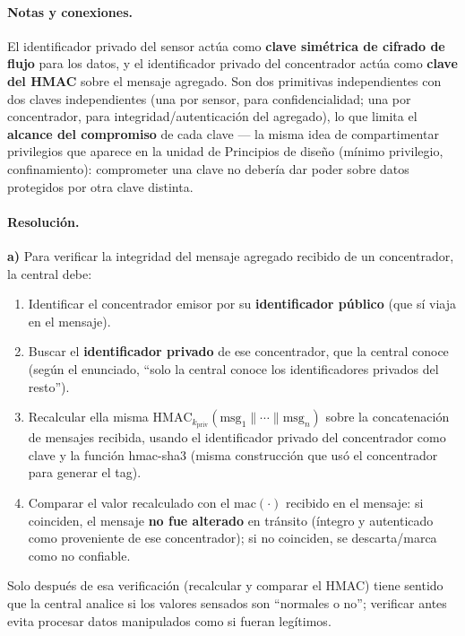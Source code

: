 \paragraph{Notas y conexiones.}
El identificador privado del sensor actúa como \textbf{clave simétrica de cifrado de
flujo} para los datos, y el identificador privado del concentrador actúa como
\textbf{clave del HMAC} sobre el mensaje agregado. Son dos primitivas independientes
con dos claves independientes (una por sensor, para confidencialidad; una por
concentrador, para integridad/autenticación del agregado), lo que limita el
\textbf{alcance del compromiso} de cada clave --- la misma idea de compartimentar
privilegios que aparece en la unidad de Principios de diseño (mínimo privilegio,
confinamiento): comprometer una clave no debería dar poder sobre datos protegidos por
otra clave distinta.

\paragraph{Resolución.}

\textbf{a)} Para verificar la integridad del mensaje agregado recibido de un
concentrador, la central debe:
\begin{enumerate}
  \item Identificar el concentrador emisor por su \textbf{identificador público}
  (que sí viaja en el mensaje).
  \item Buscar el \textbf{identificador privado} de ese concentrador, que la central
  conoce (según el enunciado, ``solo la central conoce los identificadores privados del
  resto'').
  \item Recalcular ella misma $\mathrm{HMAC}_{k_{\text{priv}}}(\text{msg}_1\|\cdots\|
  \text{msg}_n)$ sobre la concatenación de mensajes recibida, usando el identificador
  privado del concentrador como clave y la función hmac-sha3 (misma construcción que
  usó el concentrador para generar el tag).
  \item Comparar el valor recalculado con el $\mathrm{mac}(\cdot)$ recibido en el
  mensaje: si coinciden, el mensaje \textbf{no fue alterado} en tránsito (íntegro y
  autenticado como proveniente de ese concentrador); si no coinciden, se descarta/marca
  como no confiable.
\end{enumerate}
Solo después de esa verificación (recalcular y comparar el HMAC) tiene sentido que la
central analice si los valores sensados son ``normales o no''; verificar antes evita
procesar datos manipulados como si fueran legítimos.

